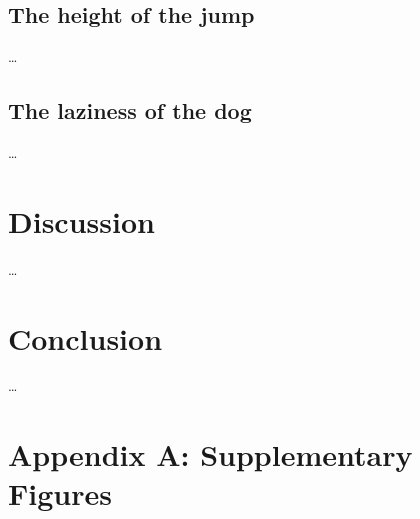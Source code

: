 \documentclass[11pt]{article}
\begin{document}
\subsection*{The height of the jump}

\ldots

\subsection*{The laziness of the dog}

\ldots

\section*{Discussion}

\ldots

\section*{Conclusion}

\ldots




\newpage{}

\section*{Appendix A: Supplementary Figures}
\end{document}
